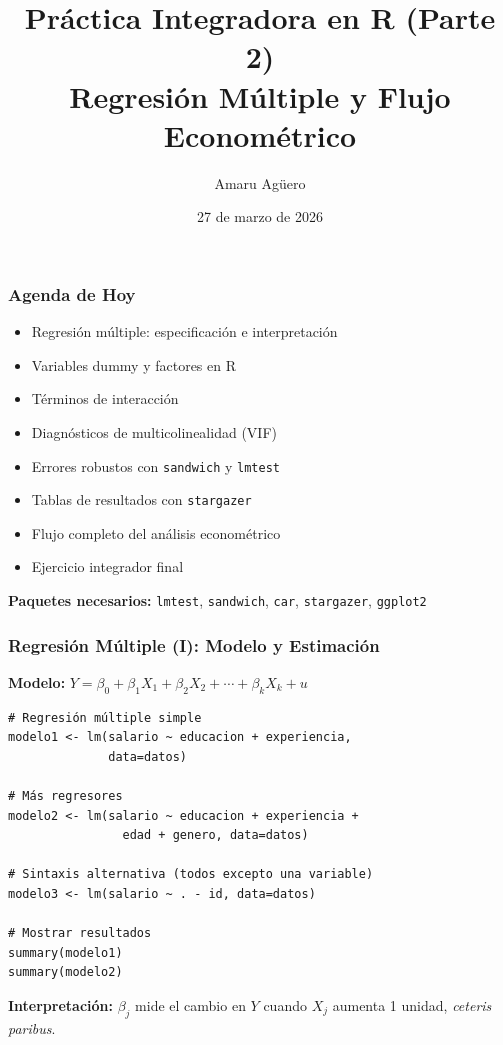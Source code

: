 \documentclass[aspectratio=169,11pt]{beamer}
\institute[CICS — UDD]{Doctorado en Ciencias de la Complejidad Social — CICS, UDD}
\title[Práctica R - Parte 2]{Práctica Integradora en R (Parte 2)\\Regresión Múltiple y Flujo Econométrico}
\author[A. Agüero]{Amaru Agüero}
\date{27 de marzo de 2026}
\begin{document}
\begin{frame}
  \titlepage
\end{frame}

\begin{frame}
  \frametitle{Agenda de Hoy}
  \small
  \begin{itemize}
    \item Regresión múltiple: especificación e interpretación
    \item Variables dummy y factores en R
    \item Términos de interacción
    \item Diagnósticos de multicolinealidad (VIF)
    \item Errores robustos con \texttt{sandwich} y \texttt{lmtest}
    \item Tablas de resultados con \texttt{stargazer}
    \item Flujo completo del análisis econométrico
    \item Ejercicio integrador final
  \end{itemize}

  \vspace{0.5cm}
  \small \textbf{Paquetes necesarios:} \texttt{lmtest}, \texttt{sandwich}, \texttt{car}, \texttt{stargazer}, \texttt{ggplot2}
\end{frame}

\begin{frame}[fragile]
  \frametitle{Regresión Múltiple (I): Modelo y Estimación}

  \textbf{Modelo:} $Y = \beta_0 + \beta_1 X_1 + \beta_2 X_2 + \cdots + \beta_k X_k + u$

  \begin{lstlisting}
# Regresión múltiple simple
modelo1 <- lm(salario ~ educacion + experiencia,
              data=datos)

# Más regresores
modelo2 <- lm(salario ~ educacion + experiencia +
                edad + genero, data=datos)

# Sintaxis alternativa (todos excepto una variable)
modelo3 <- lm(salario ~ . - id, data=datos)

# Mostrar resultados
summary(modelo1)
summary(modelo2)
  \end{lstlisting}

  \small
  \textbf{Interpretación:} $\beta_j$ mide el cambio en $Y$ cuando $X_j$ aumenta 1 unidad, \textit{ceteris paribus}.
\end{frame}
\end{document}
